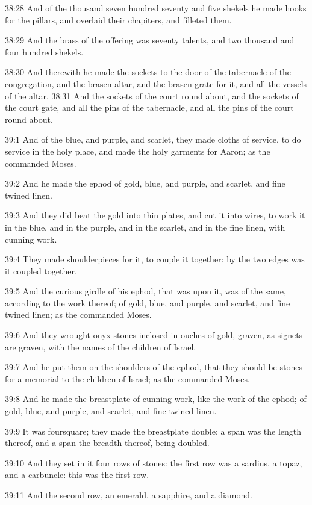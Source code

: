 38:28 And of the thousand seven hundred seventy and five shekels he made hooks for the pillars, and overlaid their chapiters, and filleted them.

38:29 And the brass of the offering was seventy talents, and two thousand and four hundred shekels.

38:30 And therewith he made the sockets to the door of the tabernacle of the congregation, and the brasen altar, and the brasen grate for it, and all the vessels of the altar, 38:31 And the sockets of the court round about, and the sockets of the court gate, and all the pins of the tabernacle, and all the pins of the court round about.

39:1 And of the blue, and purple, and scarlet, they made cloths of service, to do service in the holy place, and made the holy garments for Aaron; as the \LORD commanded Moses.

39:2 And he made the ephod of gold, blue, and purple, and scarlet, and fine twined linen.

39:3 And they did beat the gold into thin plates, and cut it into wires, to work it in the blue, and in the purple, and in the scarlet, and in the fine linen, with cunning work.

39:4 They made shoulderpieces for it, to couple it together: by the two edges was it coupled together.

39:5 And the curious girdle of his ephod, that was upon it, was of the same, according to the work thereof; of gold, blue, and purple, and scarlet, and fine twined linen; as the \LORD commanded Moses.

39:6 And they wrought onyx stones inclosed in ouches of gold, graven, as signets are graven, with the names of the children of Israel.

39:7 And he put them on the shoulders of the ephod, that they should be stones for a memorial to the children of Israel; as the \LORD commanded Moses.

39:8 And he made the breastplate of cunning work, like the work of the ephod; of gold, blue, and purple, and scarlet, and fine twined linen.

39:9 It was foursquare; they made the breastplate double: a span was the length thereof, and a span the breadth thereof, being doubled.

39:10 And they set in it four rows of stones: the first row was a sardius, a topaz, and a carbuncle: this was the first row.

39:11 And the second row, an emerald, a sapphire, and a diamond.

